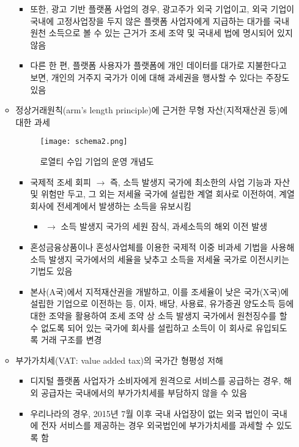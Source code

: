 \begin{itemize}
\begin{itemize}
\begin{itemize}
		\item 또한, 광고 기반 플랫폼 사업의 경우, 광고주가 외국 기업이고, 외국 기업이 국내에 고정사업장을 두지 않은 플랫폼 사업자에게 지급하는 대가를 국내 원천 소득으로 볼 수 있는 근거가 조세 조약 및 국내세 법에 명시되어 있지 않음
		\item 다른 한 편, 플랫폼 사용자가 플랫폼에 개인 데이터를 대가로 지불한다고 보면, 개인의 거주지 국가가 이에 대해 과세권을 행사할 수 있다는 주장도 있음
		\end{itemize}
	\item 정상거래원칙(arm's length principle)에 근거한 무형 자산(지적재산권 등)에 대한 과세
				\begin{figure}[htbp]
				\begin{center}
				\texttt{[image: schema2.png]}
				\caption{로열티 수입 기업의 운영 개념도}
				\label{fig:schema}
				\end{center}
				\end{figure}	
		\begin{itemize}
		\item 국제적 조세 회피 $\rightarrow$ 즉, 소득 발생지 국가에 최소한의 사업 기능과 자산 및 위험만 두고, 그 외는 저세율 국가에 설립한 계열 회사로 이전하여, 계열 회사에 전세계에서 발생하는 소득을 유보시킴
			\begin{itemize}
			\item $\rightarrow$ 소득 발생지 국가의 세원 잠식, 과세소득의 해외 이전 발생
			\end{itemize}
		\item 혼성금융상품이나 혼성사업체를 이용한 국제적 이중 비과세 기법을 사용해 소득 발생지 국가에서의 세율을 낮추고 소득을 저세율 국가로 이전시키는 기법도 있음	
		\item 본사(A국)에서 지적재산권을 개발하고, 이를 조세율이 낮은 국가(X국)에 설립한 기업으로 이전하는 등, 이자, 배당, 사용료, 유가증권 양도소득 등에 대한 조약을 활용하여 조세 조약 상 소득 발생지 국가에서 원천징수를 할 수 없도록 되어 있는 국가에 회사를 설립하고 소득이 이 회사로 유입되도록 거래 구조를 변경
		\end{itemize}	
	\item 부가가치세(VAT: value added tax)의 국가간 형평성 저해
		\begin{itemize}
		\item 디지털 플랫폼 사업자가 소비자에게 원격으로 서비스를 공급하는 경우, 해외 공급자는 국내에서의 부가가치세를 부담하지 않을 수 있음
		\item 우리나라의 경우, 2015년 7월 이후 국내 사업장이 없는 외국 법인이 국내에 전자 서비스를 제공하는 경우 외국법인에 부가가치세를 과세할 수 있도록 함
		\end{itemize}	
	\end{itemize}
\end{itemize}

